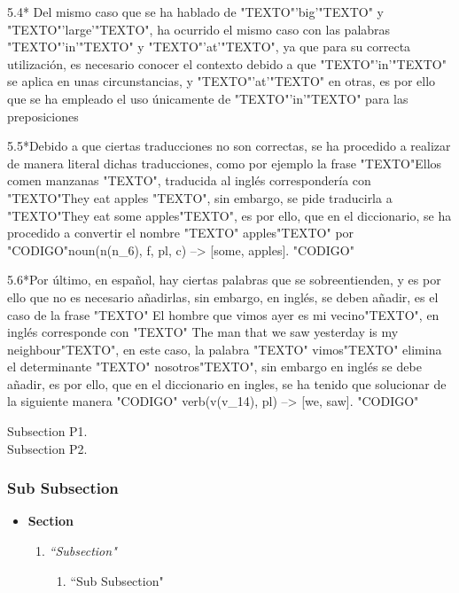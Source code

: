 ﻿\documentclass[a4paper]{article}
\begin{document}
 5.4* Del mismo caso que se ha hablado de "TEXTO"'big'"TEXTO" y "TEXTO"'large'"TEXTO", ha ocurrido el mismo caso con las palabras "TEXTO"'in'"TEXTO" y "TEXTO"'at'"TEXTO", ya que para su correcta utilización, es necesario conocer el contexto debido a que "TEXTO"'in'"TEXTO" se aplica en unas circunstancias, y "TEXTO"'at'"TEXTO" en otras, es por ello que se ha empleado el uso únicamente de "TEXTO"'in'"TEXTO" para las preposiciones
  
 5.5*Debido a que ciertas traducciones no son correctas, se ha procedido a realizar de   manera literal dichas traducciones, como por ejemplo la frase "TEXTO"Ellos comen manzanas "TEXTO",   traducida al inglés correspondería con "TEXTO"They eat apples "TEXTO", sin embargo, se pide   traducirla a "TEXTO"They eat some apples"TEXTO", es por ello, que en el diccionario, se ha     procedido a convertir el nombre "TEXTO" apples"TEXTO" por "CODIGO"noun(n(n_6), f, pl, c) --> [some,   apples]. "CODIGO"

  5.6*Por último, en español, hay ciertas palabras que se sobreentienden, y es por ello que no es necesario añadirlas, sin embargo, en inglés, se deben añadir, es el caso de la frase "TEXTO" El hombre que vimos ayer es mi vecino"TEXTO", en inglés corresponde con "TEXTO" The man that we saw yesterday is my neighbour"TEXTO", en este caso, la palabra "TEXTO" vimos"TEXTO" elimina el determinante "TEXTO" nosotros"TEXTO", sin embargo en inglés se debe añadir, es por ello, que en el diccionario en ingles, se ha tenido que solucionar de la siguiente manera "CODIGO" verb(v(v_14), pl) --> [we, saw]. "CODIGO"

    Subsection P1.\\

    Subsection P2.

    \subsubsection*{Sub Subsection}

    \begin{itemize}
        \item \textbf{Section}
        \begin{enumerate}
            \item \emph{``Subsection"}
            \begin{enumerate}
                \item ``Sub Subsection"
            \end{enumerate}
        \end{enumerate}
    \end{itemize}

    
    
\end{document}
